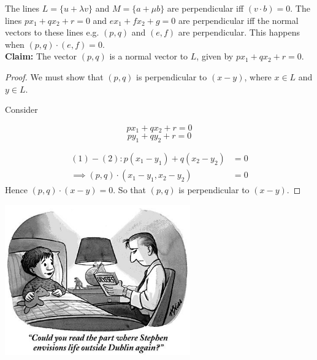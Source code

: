 \documentclass[10pt]{scrartcl}
\begin{document}
The lines $L = \{u +\lambda v\}$ and $M = \{a + \mu b\}$ are perpendicular iff $(v\cdot b) = 0$. The lines $px_1 + qx_2 +r = 0$ and $ex_1 + fx_2 + g = 0$ are perpendicular iff the normal vectors to these lines e.g. $(p,q)$ and $(e,f)$ are perpendicular. This happens when $(p,q) \cdot (e,f) = 0$.\\ 

\textbf{Claim:} The  vector $(p,q)$ is a normal vector to $L$, given by $px_1 + qx_2 + r = 0$.

\begin{proof}
We must show that $(p,q)$ is perpendicular to $(x-y)$, where $x \in L$ and $y \in L$. 

Consider

\begin{minipage}{7cm}
	\begin{center}
	
	\end{center}
\end{minipage}
\begin{minipage}{5cm}
\[  px_1 + qx_2 + r = 0 \tag{1}\]
\[  py_1 + qy_2 + r = 0 \tag{2}\]

\end{minipage}

\[
\begin{aligned}
  (1) - (2): p(x_1-y_1) + q(x_2 - y_2) &= 0\\
  \implies (p,q)\cdot(x_1-y_1,x_2-y_2) &= 0
\end{aligned}
\]
Hence $(p,q) \cdot(x-y) = 0$. So that $(p,q)$ is perpendicular to $(x-y)$.
\end{proof}


\vspace*{2.5cm}



\begin{center}
\includegraphics[width=8cm]{cartoon3.jpg}
\end{center}
\end{document}

